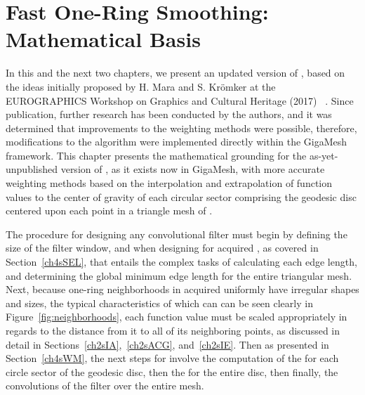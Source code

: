 \chapter{Fast One-Ring Smoothing: Mathematical Basis}
\label{ch4}
In this and the next two chapters, we present an updated version of , based on the ideas initially proposed by H. Mara and S. Krömker at the EUROGRAPHICS Workshop on Graphics and Cultural Heritage (2017) ~\cite[s.~3.2]{Mara17}. Since publication, further research has been conducted by the authors, and it was determined that improvements to the weighting methods were possible, therefore, modifications to the algorithm were implemented directly within the GigaMesh  framework. This chapter presents the mathematical grounding for the as-yet-unpublished version of , as it exists now in GigaMesh, with more accurate weighting methods based on the interpolation and extrapolation of function values to the center of gravity of each circular sector comprising the geodesic disc centered upon each point in a triangle mesh of \tdd{}.

The procedure for designing any convolutional filter must begin by defining the size of the filter window, and when designing for acquired \tdd{}, as covered in Section~\ref{ch4sSEL}, that entails the complex tasks of calculating each edge length, and determining the global minimum edge length for the entire triangular mesh. Next, because one-ring neighborhoods in acquired \tdd{} uniformly have irregular shapes and sizes, the typical characteristics of which can can be seen clearly in Figure~\ref{fig:neighborhoods}, each function value must be scaled appropriately in regards to the distance from it to all of its neighboring points, as discussed in detail in Sections~\ref{ch2sIA},~\ref{ch2sACG}, and~\ref{ch2sIE}. Then as presented in Section~\ref{ch4sWM}, the next steps for  involve the computation of the  for each circle sector of the geodesic disc, then the \wmfv{} for the entire disc, then finally, the convolutions of the filter over the entire mesh.

%
%
%
%
